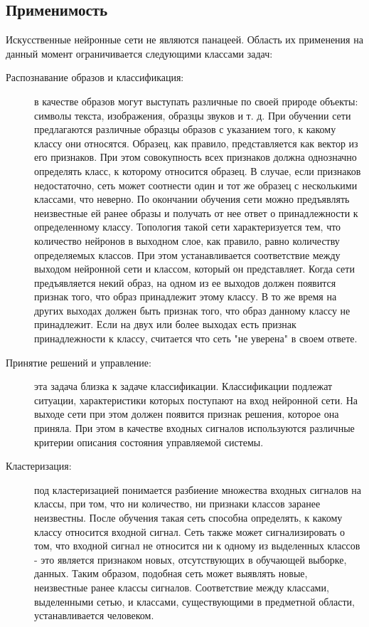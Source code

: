 \documentclass[a4paper,12pt]{report}
\begin{document}
\subsection{Применимость}
Искусственные нейронные сети не являются панацеей. Область их применения на данный момент ограничивается следующими классами задач:
\begin{description}
\item[Распознавание образов и классификация:] в качестве образов могут выступать различные по своей природе объекты: символы текста, изображения, образцы звуков и т. д. При обучении сети предлагаются различные образцы образов с указанием того, к какому классу они относятся. Образец, как правило, представляется как вектор из его признаков. При этом совокупность всех признаков должна однозначно определять класс, к которому относится образец. В случае, если признаков недостаточно, сеть может соотнести один и тот же образец с несколькими классами, что неверно. По окончании обучения сети можно предъявлять неизвестные ей ранее образы и получать от нее ответ о принадлежности к определенному классу. Топология такой сети характеризуется тем, что количество нейронов в выходном слое, как правило, равно количеству определяемых классов. При этом устанавливается соответствие между выходом нейронной сети и классом, который он представляет. Когда сети предъявляется некий образ, на одном из ее выходов должен появится признак того, что образ принадлежит этому классу. В то же время на других выходах должен быть признак того, что образ данному классу не принадлежит. Если на двух или более выходах есть признак принадлежности к классу, считается что сеть "не уверена" в своем ответе.

\item[Принятие решений и управление:] эта задача близка к задаче классификации. Классификации подлежат ситуации, характеристики которых поступают на вход нейронной сети. На выходе сети при этом должен появится признак решения, которое она приняла. При этом в качестве входных сигналов используются различные критерии описания состояния управляемой системы.

\item[Кластеризация:] под кластеризацией понимается разбиение множества входных сигналов на классы, при том, что ни количество, ни признаки классов заранее неизвестны. После обучения такая сеть способна определять, к какому классу относится входной сигнал. Сеть также может сигнализировать о том, что входной сигнал не относится ни к одному из выделенных классов - это является признаком новых, отсутствующих в обучающей выборке, данных. Таким образом, подобная сеть может выявлять новые, неизвестные ранее классы сигналов. Соответствие между классами, выделенными сетью, и классами, существующими в предметной области, устанавливается человеком.


\end{description}
\end{document}
